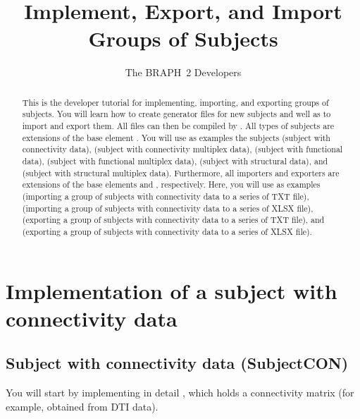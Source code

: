 \documentclass{tufte-handout}
\title{Implement, Export, and Import Groups of Subjects}
\author[The BRAPH~2 Developers]{The BRAPH~2 Developers}
\begin{document}
\maketitle

\begin{abstract}
This is the developer tutorial for implementing, importing, and exporting groups of subjects.
You will learn how to create generator files  for new subjects and well as to import and export them. All  files can then be compiled by . 
All types of subjects are extensions of the base element . 
You will use as examples the subjects  (subject with connectivity data),  (subject with connectivity multiplex data),  (subject with functional data),  (subject with functional multiplex data),  (subject with structural data), and  (subject with structural multiplex data). 
Furthermore, all importers and exporters are extensions of the base elements  and , respectively. Here, you will use as examples  (importing a group of subjects with connectivity data to a series of TXT file), (importing a group of subjects with connectivity data to a series of XLSX file),  (exporting a group of subjects with connectivity data to a series of TXT file), and  (exporting a group of subjects with connectivity data to a series of XLSX file).
\end{abstract}

\tableofcontents

\clearpage

\section{Implementation of a subject with connectivity data}

\subsection{Subject with connectivity data (SubjectCON)}

You will start by implementing in detail , which holds a connectivity matrix (for example, obtained from DTI data).
\end{document}
